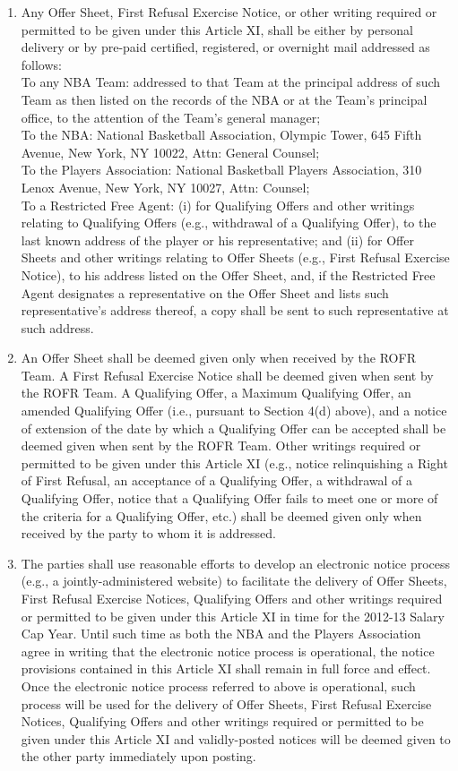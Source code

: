 \documentclass[
]{book}
\begin{document}
\begin{enumerate}
\item
  Any Offer Sheet, First Refusal Exercise Notice, or other writing required or permitted to be given under this Article XI, shall be either by personal delivery or by pre-paid certified, registered, or overnight mail addressed as follows:\\
  To any NBA Team: addressed to that Team at the principal address of such Team as then listed on the records of the NBA or at the Team's principal office, to the attention of the Team's general manager;\\
  To the NBA: National Basketball Association, Olympic Tower, 645 Fifth Avenue, New York, NY 10022, Attn: General Counsel;\\
  To the Players Association: National Basketball Players Association, 310 Lenox Avenue, New York, NY 10027, Attn: Counsel;\\
  To a Restricted Free Agent: (i) for Qualifying Offers and other writings relating to Qualifying Offers (e.g., withdrawal of a Qualifying Offer), to the last known address of the player or his representative; and (ii) for Offer Sheets and other writings relating to Offer Sheets (e.g., First Refusal Exercise Notice), to his address listed on the Offer Sheet, and, if the Restricted Free Agent designates a representative on the Offer Sheet and lists such representative's address thereof, a copy shall be sent to such representative at such address.
\item
  An Offer Sheet shall be deemed given only when received by the ROFR Team. A First Refusal Exercise Notice shall be deemed given when sent by the ROFR Team. A Qualifying Offer, a Maximum Qualifying Offer, an amended Qualifying Offer (i.e., pursuant to Section 4(d) above), and a notice of extension of the date by which a Qualifying Offer can be accepted shall be deemed given when sent by the ROFR Team. Other writings required or permitted to be given under this Article XI (e.g., notice relinquishing a Right of First Refusal, an acceptance of a Qualifying Offer, a withdrawal of a Qualifying Offer, notice that a Qualifying Offer fails to meet one or more of the criteria for a Qualifying Offer, etc.) shall be deemed given only when received by the party to whom it is addressed.
\item
  The parties shall use reasonable efforts to develop an electronic notice process (e.g., a jointly-administered website) to facilitate the delivery of Offer Sheets, First Refusal Exercise Notices, Qualifying Offers and other writings required or permitted to be given under this Article XI in time for the 2012-13 Salary Cap Year. Until such time as both the NBA and the Players Association agree in writing that the electronic notice process is operational, the notice provisions contained in this Article XI shall remain in full force and effect. Once the electronic notice process referred to above is operational, such process will be used for the delivery of Offer Sheets, First Refusal Exercise Notices, Qualifying Offers and other writings required or permitted to be given under this Article XI and validly-posted notices will be deemed given to the other party immediately upon posting.
\end{enumerate}
\end{document}
